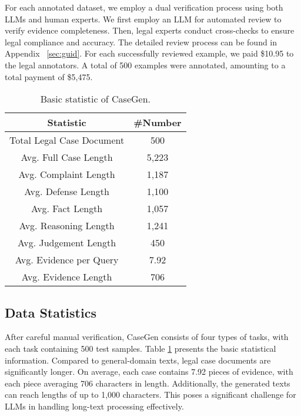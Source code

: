 For each annotated dataset, we employ a dual verification process using both LLMs and human experts.
We first employ an LLM for automated review to verify evidence completeness. Then, legal experts conduct cross-checks to ensure legal compliance and accuracy. The detailed review process can be found in Appendix ~\ref{sec:guid}.
For each successfully reviewed example, we paid \$10.95 to the legal annotators. A total of 500 examples were annotated, amounting to a total payment of \$5,475. 



\begin{table}[t]
\centering
\begin{tabular}{cc}
\hline
\textbf{Statistic}        & \textbf{\#Number} \\ \hline
Total Legal Case Document & 500               \\
Avg. Full Case Length     & 5,223             \\
Avg. Complaint Length     & 1,187             \\
Avg. Defense Length       & 1,100             \\
Avg. Fact Length          & 1,057             \\
Avg. Reasoning Length     & 1,241             \\
Avg. Judgement Length     & 450               \\
Avg. Evidence per Query   & 7.92              \\
Avg. Evidence Length      & 706               \\ \hline
\end{tabular}
\caption{Basic statistic of CaseGen.}
\label{table:sta}
\vspace{-5mm}
\end{table}



\subsection{Data Statistics}
After careful manual verification, CaseGen consists of four types of tasks, with each task containing 500 test samples. Table \ref{table:sta} presents the basic statistical information.
Compared to general-domain texts, legal case documents are significantly longer. On average, each case contains 7.92 pieces of evidence, with each piece averaging 706 characters in length. Additionally, the generated texts can reach lengths of up to 1,000 characters. This poses a significant challenge for LLMs in handling long-text processing effectively.



